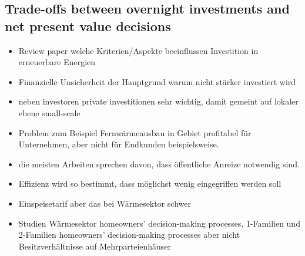 \subsection{Trade-offs between overnight investments and net present value decisions}\label{aspect3}
\begin{itemize}
	
	\item[\textcolor{col}{\textbullet}] \textcolor{col}{Review paper welche Kriterien/Aspekte beeinflussen Investition in erneuerbare Energien}
	\item[\textcolor{col}{\textbullet}] \textcolor{col}{Finanzielle Unsicherheit der Hauptgrund warum nicht stärker investiert wird}
	\item[\textcolor{col}{\textbullet}] \textcolor{col}{neben investoren private investitionen sehr wichtig, damit gemeint auf lokaler ebene small-scale}
	\item[\textcolor{col}{\textbullet}] \textcolor{col}{Problem zum Beispiel Fernwärmeausbau in Gebiet profitabel für Unternehmen, aber nicht für Endkunden beispielsweise.}
	\item[\textcolor{col}{\textbullet}] \textcolor{col}{die meisten Arbeiten sprechen davon, dass öffentliche Anreize notwendig sind.}
	\item[\textcolor{col}{\textbullet}] \textcolor{col}{Effizienz wird so bestimmt, dass möglichst wenig eingegriffen werden soll}
	\item[\textcolor{col}{\textbullet}] \textcolor{col}{Einspeisetarif aber das bei Wärmesektor schwer}
	\item[\textcolor{col}{\textbullet}] \textcolor{col}{Studien Wärmesektor homeowners’ decision-making processes, 1-Familien und 2-Familien homeowners’ decision-making processes aber nicht Besitzverhältnisse auf Mehrparteienhäuser}
\end{itemize}

